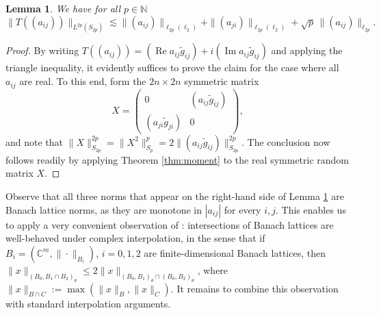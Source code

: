 \documentclass[10pt,reqno]{amsart}
\newtheorem{lem}[thm]{Lemma}
\theoremstyle{definition}
\numberwithin{equation}{section}
\numberwithin{figure}{section}
\numberwithin{table}{section}
\begin{document}
\begin{lem}
\label{lem:complext}
We have for all $p\in\mathbb{N}$
$$
	\|T((a_{ij}))\|_{L^{2p}(S_{2p})}\lesssim
	\|(a_{ij})\|_{\ell_{2p}(\ell_2)} +
	\|(a_{ji})\|_{\ell_{2p}(\ell_2)} + \sqrt{p}\,\|(a_{ij})\|_{\ell_{2p}}.
$$
\end{lem}

\begin{proof}
By writing $T((a_{ij})) = (\mathop{\mathrm{Re}}a_{ij}\tilde g_{ij}) +
i(\mathop{\mathrm{Im}}a_{ij}\tilde g_{ij})$ and applying the triangle 
inequality, it evidently suffices to prove the claim for the case where
all $a_{ij}$ are real. To this end, form the $2n\times 2n$ symmetric 
matrix
$$
	X =
	\begin{pmatrix}
	0 & (a_{ij}\tilde g_{ij}) \\
	(a_{ji}\tilde g_{ji}) & 0
	\end{pmatrix},
$$
and note that $\|X\|_{S_{2p}}^{2p} =
\|X^2\|_{S_p}^p = 2\|(a_{ij}\tilde g_{ij})\|_{S_{2p}}^{2p}$.
The conclusion now follows readily by applying Theorem \ref{thm:moment}
to the real symmetric random matrix $X$.
\end{proof}

Observe that all three norms that appear on the right-hand side of Lemma 
\ref{lem:complext} are Banach lattice norms, as they are monotone in 
$|a_{ij}|$ for every $i,j$. This enables us to apply a very convenient 
observation of \cite[Theorem 2]{Mal87}: intersections of Banach lattices 
are well-behaved under complex interpolation, in the sense that if
$B_i=(\mathbb{C}^m,\|\cdot\|_{B_i})$, $i=0,1,2$ are finite-dimensional 
Banach lattices, then $\|x\|_{(B_0,B_1\cap B_2)_\theta}\le
2\|x\|_{(B_0,B_1)_\theta\cap(B_0,B_2)_\theta}$, where
$\|x\|_{B\cap C}:=\max(\|x\|_B,\|x\|_C)$. It remains to combine this 
observation with standard interpolation arguments.
\end{document}
